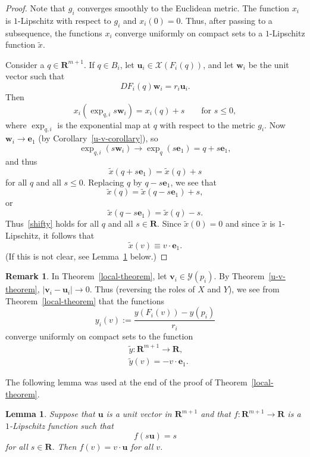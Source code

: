 \documentclass{amsart}
\newcommand{\RR}{\mathbf{R}}  %
\newcommand{\Xx}{\mathcal{X}}
\newcommand{\Yy}{\mathcal{Y}}
\newcommand{\vv}{\mathbf v}
\newcommand{\ww}{\mathbf w}
\newcommand{\ee}{\mathbf e}
\newcommand{\uu}{\mathbf{u}}
\newtheorem{lemma}      [theorem]       {Lemma}
\theoremstyle{definition}
\theoremstyle{definition}
\newtheorem{remark}   [theorem]       {Remark}
\begin{document}
\begin{proof}
Note that $g_i$ converges smoothly to the Euclidean metric.
The function $x_i$ is $1$-Lipschitz with respect to $g_i$
and $x_i(0)=0$.  Thus, after passing to a subsequence, the functions $x_i$ converge uniformly
on compact sets to a $1$-Lipschitz function $\tilde x$.

Consider a $q\in \RR^{m+1}$.  If $q\in B_i$, let $\uu_i\in \Xx(F_i(q))$,
and let $\ww_i$ be the unit vector such that
\[
   DF_i(q)\ww_i = r_i \uu_i.
\]
Then
\[
   x_i(\exp_{q,i}{s\ww_i}) = x_i(q)  + s \qquad\text{for $s\le 0$},
\]
where $\exp_{q,i}$ is the exponential map at $q$ with respect to the metric $g_i$.
Now $\ww_i\to \ee_1$ (by Corollary~\ref{u-v-corollary}), so
\[
  \exp_{q,i}(s\ww_i) \to \exp_q(s\ee_1) = q + s\ee_1,
\]
and thus
\begin{equation}\label{shifty}
  \tilde x(q + s\ee_1) = \tilde x(q) + s 
\end{equation}
for all $q$ and all $s\le 0$.  Replacing $q$ by $q-s\ee_1$, we see that
\[
  \tilde x(q) = \tilde x(q-s\ee_1) + s,
\]
or
\[
 \tilde x(q-s\ee_1) = \tilde x(q) - s.
\]
Thus~\eqref{shifty} holds for all $q$ and all $s\in\RR$.
Since $\tilde x(0)=0$ and since $\tilde x$ is $1$-Lipschitz, 
it follows that 
\[
  \tilde x(v)\equiv v\cdot \ee_1.
\]
(If this is not clear, see Lemma~\ref{tight-lemma} below.)
\end{proof}

\begin{remark}\label{local-remark}
In Theorem~\ref{local-theorem}, let $\vv_i\in \Yy(p_i)$.
By Theorem~\ref{u-v-theorem}, $|\vv_i-\uu_i| \to 0$.
Thus (reversing the roles of $X$ and $Y$),
we see from Theorem~\ref{local-theorem} that the functions
\[
y_i(v) := \frac{y(F_i(v)) - y(p_i)}{r_i}
\]
converge uniformly on compact sets to the function
\begin{align*}
&\tilde y: \RR^{m+1}\to \RR, \\
&\tilde y(v) = - v\cdot \ee_1.
\end{align*}
\end{remark}

The following lemma was used at the end of the proof of Theorem~\ref{local-theorem}.

\begin{lemma}\label{tight-lemma}
Suppose that $\uu$ is a unit vector in $\RR^{m+1}$ and
that $f: \RR^{m+1}\to \RR$ is a $1$-Lipschitz function such that
\[
   f(s\uu) = s
\]
for all $s\in \RR$.  Then $f(v)= v\cdot\uu$ for all $v$.
\end{lemma}
\end{document}
